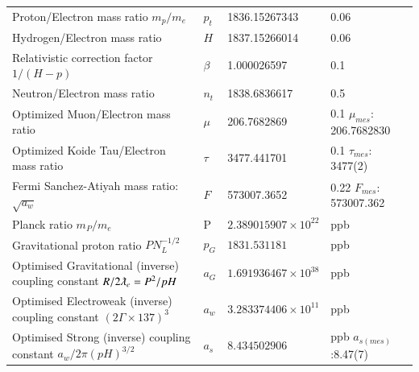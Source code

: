 \documentclass[a4paper,9pt]{article}
\newcounter{row}
\begin{document}
\begin{table}
\begin{tabular}{llll}
    Proton/Electron mass ratio $m_p/m_e$ & $p_t$   & 1836.15267343  & 0.06 \\  
    Hydrogen/Electron mass ratio  & $H$  & 1837.15266014  & 0.06 \\
    Relativistic correction factor $1/(H-p)$ & $\beta$  & 1.000026597  & 0.1 \\
    Neutron/Electron mass ratio  & $n_t$ & 1838.6836617  & 0.5 \\     
    Optimized Muon/Electron mass ratio  & $\mu$ & 206.7682869  & 0.1 $\mu_{mes}$: 206.7682830 \\     
    Optimized Koide Tau/Electron mass ratio  & $\tau$ & 3477.441701  & 0.1 $\tau_{mes}$: 3477(2) \\  
 Fermi Sanchez-Atiyah mass ratio: $\sqrt {a_w}$ & $F$   & 573007.3652  & 0.22 $F_{mes}$: 573007.362 \\
 Planck ratio $m_P/m_e$ & P   & $2.389015907 \times 10^{22}$ &ppb  \cite{Sanchez2}  \\
Gravitational proton ratio $P N_L^{-1/2}$ & $p_G$    & $ 1831.531181 $ &ppb  \cite{Sanchez2}  \\
Optimised Gravitational (inverse) coupling constant $R/2\lambdabar_e = P^2/pH$ & $a_G$   & $1.691936467 \times 10^{38}$ &ppb  \cite{Sanchez2}  \\
Optimised Electroweak (inverse) coupling constant $(2\Gamma\times 137)^3$ & $a_w$     & $3.283374406 \times 10^{11}$ & ppb \cite{Sanchez2}  \\
Optimised Strong (inverse) coupling constant $a_w/2\pi(pH)^{3/2}$ & $a_s$   & $8.434502906$ & ppb \cite{Sanchez2} $a_{s(mes)}$:8.47(7) \\
 
 
   
    
         
   \bottomrule
  \end{tabular}
\end{table}
 
\end{document}
